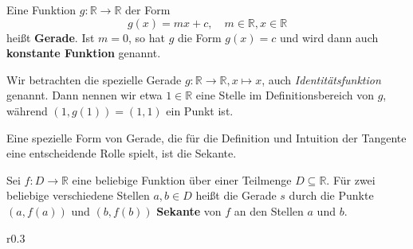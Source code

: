 \begin{definition}
    Eine Funktion \(g:\mathbb R \to \mathbb R\) der Form 
    \begin{equation*}
        g(x) = mx + c, \quad m \in \mathbb R, x \in \mathbb R
    \end{equation*}
    heißt \textbf{Gerade}. Ist \(m=0\), so hat \(g\) die Form \(g(x) = c\) und wird dann auch \textbf{konstante Funktion} genannt. 
\end{definition}

\begin{example}
    Wir betrachten die spezielle Gerade \(g:\mathbb R \to \mathbb R, x \mapsto x\), auch \textit{Identitätsfunktion} genannt. Dann nennen wir etwa \(1\in \mathbb R\) eine Stelle im Definitionsbereich von \(g\), während \((1,g(1)) = (1,1)\) ein Punkt ist. 
\end{example}

Eine spezielle Form von Gerade, die für die Definition und Intuition der Tangente eine entscheidende Rolle spielt, ist die Sekante.
\begin{definition}[Sekante]
    Sei \(f: D \to \mathbb R\) eine beliebige Funktion über einer Teilmenge \(D\subseteq \mathbb R\). Für zwei beliebige verschiedene Stellen $a, b \in D$ heißt die Gerade \(s\) durch die Punkte \((a,f(a))\) und \((b,f(b))\) \textbf{Sekante} von \(f\) an den Stellen \(a\) und \(b\). 
\end{definition}

\begin{wrapfigure}{r}{0.3\textwidth}
    \begin{center}
    \end{center}
\end{wrapfigure}

